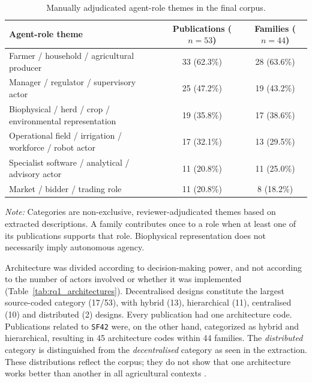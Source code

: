 \documentclass[11pt,a4paper]{article}
\begin{document}
\begin{table}[H]
\centering
\small

\caption{Manually adjudicated agent-role themes in the final corpus.}
\label{tab:rq1_agent_roles}

\begin{tabularx}{\textwidth}{@{}Xcc@{}}
\toprule

\textbf{Agent-role theme} &
\textbf{Publications ($n=53$)} &
\textbf{Families ($n=44$)} \\

\midrule

Farmer / household / agricultural producer &
33 (62.3\%) & 28 (63.6\%) \\

Manager / regulator / supervisory actor &
25 (47.2\%) & 19 (43.2\%) \\

Biophysical / herd / crop / environmental representation &
19 (35.8\%) & 17 (38.6\%) \\

Operational field / irrigation / workforce / robot actor &
17 (32.1\%) & 13 (29.5\%) \\

Specialist software / analytical / advisory actor &
11 (20.8\%) & 11 (25.0\%) \\

Market / bidder / trading role &
11 (20.8\%) & 8 (18.2\%) \\

\bottomrule
\end{tabularx}

\par\smallskip

\begin{minipage}{\textwidth}
\footnotesize
\emph{Note:} Categories are non-exclusive,
reviewer-adjudicated themes based on extracted descriptions.
A family contributes once to a role when at least one of
its publications supports that role. Biophysical
representation does not necessarily imply autonomous agency.
\end{minipage}

\end{table}

Architecture was divided according to decision-making power, and not according to the number of actors involved or whether it was implemented (Table~\ref{tab:rq1_architectures}). Decentralised designs constitute the largest source-coded category (17/53), with hybrid (13), hierarchical (11), centralised (10) and distributed (2) designs. Every publication had one
architecture code. Publications related to \texttt{SF42} were, on the
other hand, categorized as hybrid and hierarchical, resulting in 45 architecture codes within 44 families. The \emph{distributed} category is distinguished from the \emph{decentralised} category as seen in the extraction. These distributions reflect the corpus; they do not show that one architecture works better than another in all agricultural contexts \parencite{agyeman_semi-centralized_2025,therond_integrated_2014}.
\end{document}
